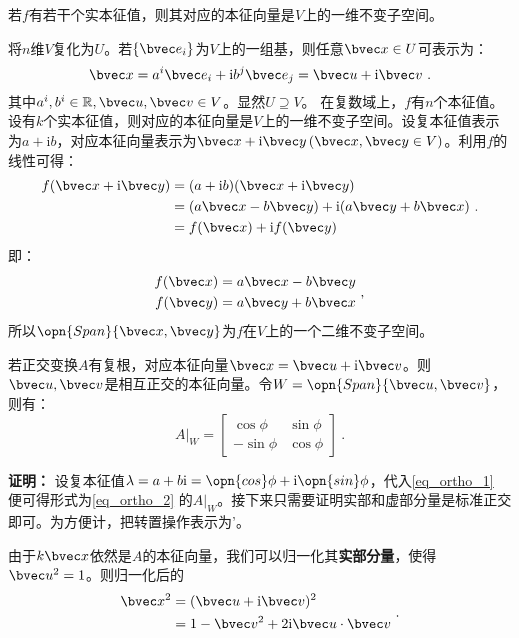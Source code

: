 若$f$有若干个实本征值，则其对应的本征向量是$V$上的一维不变子空间。

将$n$维$V$复化为$U$。若$\{\bvec e_i\}$为$V$上的一组基，则任意$\bvec x\in U$可表示为：
\begin{equation}
\bvec x=a^i\bvec e_i+\mathrm i b^j\bvec e_j=\bvec u+\mathrm i\bvec v~.
\end{equation}
其中$a^i,b^i\in \mathbb R,\bvec u,\bvec v\in V$。显然$U\supseteq V$。
在复数域上，$f$有$n$个本征值。设有$k$个实本征值，则对应的本征向量是$V$上的一维不变子空间。设复本征值表示为$a+\mathrm ib$，对应本征向量表示为$\bvec x+\mathrm i \bvec y\,(\bvec x,\bvec y\in V)$。利用$f$的线性可得：
\begin{equation}
\begin{aligned}
f(\bvec x+\mathrm i \bvec y)&=(a+\mathrm i b)(\bvec x+\mathrm i \bvec y)\\
&=(a\bvec x-b\bvec y)+\mathrm i(a\bvec y+b\bvec x)\\
&=f(\bvec x)+\mathrm if(\bvec y)
\end{aligned}~.
\end{equation}
即：
\begin{equation}\label{eq_ortho_1}
\begin{aligned}
f(\bvec x)&=a\bvec x-b\bvec y\\
f(\bvec y)&=a\bvec y+b\bvec x
\end{aligned}~,
\end{equation}
所以$\opn{Span}\{\bvec x,\bvec y\}$为$f$在$V$上的一个二维不变子空间。
\begin{lemma}{}\label{lem_ortho_3}
若正交变换$A$有复根，对应本征向量$\bvec x=\bvec u+\mathrm i\bvec v$。则$\bvec u,\bvec v$是相互正交的本征向量。令$W=\opn{Span}\{\bvec u,\bvec v\}$，则有：
\begin{equation}\label{eq_ortho_2}
A|_W=\left[\begin{array}{rr}
\cos \phi & \sin \phi \\
-\sin \phi & \cos \phi
\end{array}\right]~.
\end{equation}
\end{lemma}
\textbf{证明：}
设复本征值$\lambda=a+b\mathrm i=\opn{cos}\phi+\mathrm i \opn{sin}\phi$，代入\autoref{eq_ortho_1} 便可得形式为\autoref{eq_ortho_2} 的$A|_W$。接下来只需要证明实部和虚部分量是标准正交即可。为方便计，把转置操作表示为'。

由于$k\bvec x$依然是$A$的本征向量，我们可以归一化其\textbf{实部分量}，使得$\bvec u^2=1$。则归一化后的
\begin{equation}\label{eq_ortho_3}
\begin{aligned}
\bvec x^2&=(\bvec u+\mathrm i\bvec v)^2\\
&=1-\bvec v^2+2\mathrm i \bvec u\cdot\bvec v
\end{aligned}~.
\end{equation}

